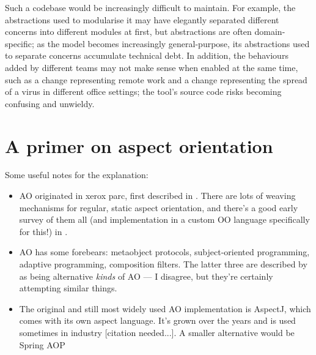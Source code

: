 Such a codebase would be increasingly difficult to maintain. For example, the
abstractions used to modularise it may have elegantly separated different
concerns into different modules at first, but abstractions are often
domain-specific; as the model becomes increasingly general-purpose, its
abstractions used to separate concerns accumulate technical debt. In addition,
the behaviours added by different teams may not make sense when enabled at the
same time, such as a change representing remote work and a change representing
the spread of a virus in different office settings; the tool's source code risks
becoming confusing and unwieldy.






\section{A primer on aspect orientation}

 Some useful notes for the
explanation:

\begin{itemize}
    \item AO originated in xerox parc, first described in
    \cite{kiczales1997aspect}. There are lots of weaving mechanisms for regular,
    static aspect orientation, and there's a good early survey of them all (and
    implementation in a custom OO language specifically for this!) in
    \cite{masuhara2003modeling}.
    \item AO has some forebears: metaobject protocols, subject-oriented
    programming, adaptive programming, composition filters. The latter three are
    described by \cite{chibani2019using} as being alternative \emph{kinds} of AO
    --- I disagree, but they're certainly attempting similar things.
    \item The original and still most widely used AO implementation is AspectJ,
    which comes with its own aspect language. It's grown over the years and is
    used sometimes in industry [citation needed...]. A smaller alternative would
    be Spring AOP
\end{itemize}



